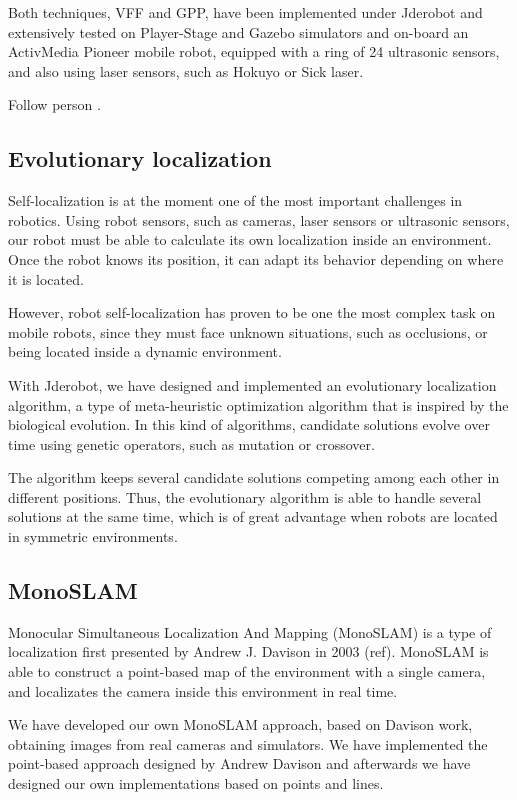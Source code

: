 \documentclass[twocolumn]{svjour3}          %
\begin{document}
Both techniques, VFF and GPP, have been implemented under Jderobot and extensively tested on Player-Stage and Gazebo simulators and on-board an ActivMedia Pioneer mobile robot, equipped with a ring of 24 ultrasonic sensors, and also using laser sensors, such as Hokuyo or Sick laser.

Follow person \cite{canas05d}.

\subsection{Evolutionary localization}

Self-localization is at the moment one of the most important challenges in robotics. Using robot sensors, such as cameras, laser sensors or ultrasonic sensors, our robot must be able to calculate its own localization inside an environment. Once the robot knows its position, it can adapt its behavior depending on where it is located. 
 
However, robot self-localization has proven to be one the most complex task on mobile robots, since they must face unknown situations, such as occlusions, or being located inside a dynamic environment.

With Jderobot, we have designed and implemented an evolutionary localization algorithm, a type of meta-heuristic optimization algorithm that is inspired by the biological evolution. In this kind of algorithms, candidate solutions evolve over time using genetic operators, such as mutation or crossover. 

The algorithm keeps several candidate solutions competing among each other in different positions. Thus, the evolutionary algorithm is able to handle several solutions at the same time, which is of great advantage when robots are located in symmetric environments.  

\subsection{MonoSLAM}

Monocular Simultaneous Localization And Mapping (MonoSLAM) is a type of localization first presented by Andrew J. Davison in 2003 (ref). MonoSLAM is able to construct a point-based map of the environment with a single camera, and localizates the camera inside this environment in real time.

We have developed our own MonoSLAM approach, based on Davison work, obtaining images from real cameras and simulators. We have implemented the point-based approach designed by Andrew Davison and afterwards we have designed our own implementations based on points and lines.
\end{document}
